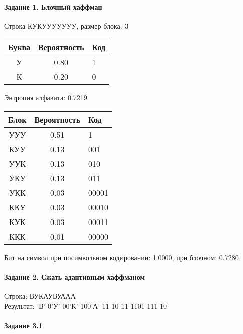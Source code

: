 \documentclass[a4paper, 12pt]{article}
\begin{document}
\paragraph{Задание 1. Блочный хаффман \\}

Строка КУКУУУУУУУ, размер блока: 3
\begin{center}
 \begin{tabular}{ |c|c|l| } 
  \hline
     Буква & Вероятность & Код\\ \hline
У & 0.80 & 1\\\hline
К & 0.20 & 0
\\ \hline \end{tabular}
\end{center}
Энтропия алфавита: 0.7219
\begin{center}
 \begin{tabular}{ |c|c|l| } 
  \hline
     Блок & Вероятность & Код\\ \hline
УУУ & 0.51 & 1\\\hline
КУУ & 0.13 & 001\\\hline
УУК & 0.13 & 010\\\hline
УКУ & 0.13 & 011\\\hline
УКК & 0.03 & 00001\\\hline
ККУ & 0.03 & 00010\\\hline
КУК & 0.03 & 00011\\\hline
ККК & 0.01 & 00000
\\ \hline \end{tabular}
\end{center}
Бит на символ при посимвольном кодировании: 1.0000, при блочном: 0.7280


\pagebreak
\paragraph{Задание 2. Сжать адаптивным хаффманом\\}

Строка: 
ВУКАУВУААА\\
Результат: 'В' 0'У' 00'К' 100'А' 11 10 11 1101 111 10










\pagebreak
\paragraph{Задание 3.1}
\end{document}
